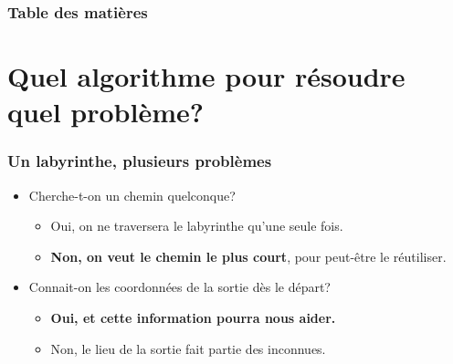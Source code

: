 \documentclass[]{beamer}
\begin{document}
\begin{frame}
  \frametitle{Table des matières}
  \tableofcontents
\end{frame} %

\section{Quel algorithme pour résoudre quel problème?}
\begin{frame} 
  \frametitle{Un labyrinthe, plusieurs problèmes}
  \begin{itemize}
  \item<1-> Cherche-t-on un chemin quelconque?
    \begin{itemize}
    \item Oui, on ne traversera le labyrinthe qu'une seule fois.
    \item \textbf<2->{Non, on veut le chemin le plus court},
      pour peut-être le réutiliser.
    \end{itemize}
  \item<3-> Connait-on les coordonnées de la sortie dès le départ?
    \begin{itemize}
    \item \textbf<4->{Oui, et cette information pourra nous aider.}
    \item Non, le lieu de la sortie fait partie des inconnues.
    \end{itemize}
  \end{itemize}
\end{frame} %
\end{document}
